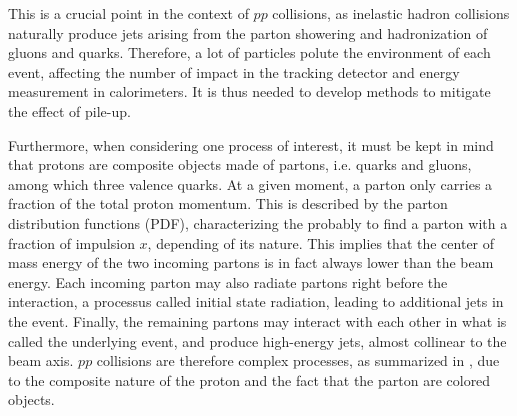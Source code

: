 
    This is a crucial point in the context of $pp$ collisions, as inelastic hadron collisions
    naturally produce jets arising from the parton showering and hadronization of gluons
    and quarks. Therefore, a lot of particles polute the environment of each event, affecting the
    number of impact in the tracking detector and energy measurement in calorimeters.
    It is thus needed to develop methods to mitigate the effect of pile-up.

    Furthermore, when considering one process of interest, it must be kept in mind that
    protons are composite objects made of partons, i.e. quarks and gluons, among which three
    valence quarks. At a given moment, a parton only carries a fraction of the total
    proton momentum. This is described by the parton distribution functions (PDF), characterizing
    the probably to find a parton with a fraction of impulsion $x$, depending of its
    nature. This implies that the center of mass energy of the two incoming partons is in
    fact always lower than the beam energy. Each incoming parton may also radiate partons
    right before the interaction, a processus called initial state radiation, leading to
    additional jets in the event. Finally, the remaining partons may interact with each
    other in what is called the underlying event, and produce high-energy jets, almost
    collinear to the beam axis.  $pp$ collisions
    are therefore complex processes, as summarized in , due
    to the composite nature of the proton and the fact that the parton are colored objects.



